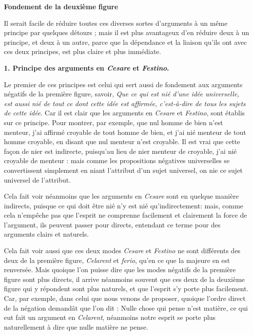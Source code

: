 \begin{center}{\bfseries Fondement de la deuxième figure}\end{center}

Il serait facile de réduire toutes ces diverses sortes d'arguments à un même principe par quelques détours ; mais il est plus avantageux d'en réduire deux à un principe, et deux à un autre, parce que la dépendance et la liaison qu'ils ont avec ces deux principes, est plus claire et plus immédiate.


\begin{center}{\bfseries 1. Principe des arguments en \emph{Cesare} et \emph{Festino}.}\end{center}

Le premier de ces principes est celui qui sert aussi de fondement aux arguments négatifs de la première figure, savoir, \emph{Que ce qui est nié d'une idée universelle, est aussi nié de tout ce dont cette idée est affirmée, c'est-à-dire de tous les sujets de cette idée}. Car il est clair que les arguments en \emph{Cesare} et \emph{Festino}, sont établis sur ce principe. Pour montrer, par exemple, que nul homme de bien n'est menteur, j'ai affirmé croyable de tout homme de bien, et j'ai nié menteur de tout homme croyable, en disant que nul menteur n'est croyable. Il est vrai que cette façon de nier est indirecte, puisqu'au lieu de nier menteur de croyable, j'ai nié croyable de menteur : mais comme les propositions négatives universelles se convertissent simplement en niant l'attribut d'un sujet universel, on nie ce sujet universel de l'attribut.

Cela fait voir néanmoins que les arguments en \emph{Cesare} sont en quelque manière indirects, puisque ce qui doit être nié n'y est nié qu'indirectement: mais, comme cela n'empêche pas que l'esprit ne comprenne facilement et clairement la force de l'argument, ils peuvent passer pour directs, entendant ce terme pour des arguments clairs et naturels.

Cela fait voir aussi que ces deux modes \emph{Cesare} et \emph{Festino} ne
sont différents des deux de la première figure, \emph{Celarent} et \emph{ferio},
qu'en ce que la majeure en est renversée. Mais quoique l'on
puisse dire que les modes négatifs de la première figure sont plus
directs, il arrive néanmoins souvent que ces deux de la deuxième
figure qui y répondent sont plus naturels, et que l'esprit s'y porte
plus facilement. Car, par exemple, dans celui que nous venons de
proposer, quoique l'ordre direct de la négation demandât que l'on
dit : Nulle chose qui pense n'est matière, ce qui eut fait un argument en \emph{Celarent}, néanmoins notre esprit se porte plus naturellement à dire que nulle matière ne pense.

